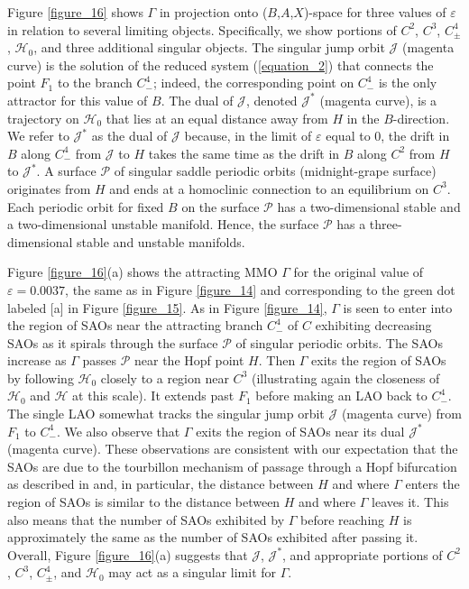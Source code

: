 \documentclass{ws-ijbc}
\begin{document}
Figure \ref{figure_16} shows $\Gamma$ in projection onto ($B$,$A$,$X$)-space for three values of $\varepsilon$ in relation to several limiting objects.  Specifically, we show portions of $C^2$, $C^3$, $C^4_\pm$, $\mathscr{H}_0$, and three additional singular objects.  The singular jump orbit $\mathscr{J}$ (magenta curve) is the solution of the reduced system (\ref{equation_2}) that connects the point $F_1$ to the branch $C^4_-$; indeed, the corresponding point on $C^4_-$ is the only attractor for this value of $B$.  The dual of $\mathscr{J}$, denoted $\mathscr{J}^*$ (magenta curve), is a trajectory on $\mathscr{H}_0$ that lies at an equal distance away from $H$ in the $B$-direction.  We refer to $\mathscr{J}^*$ as the dual of $\mathscr{J}$ because, in the limit of $\varepsilon$ equal to $0$, the drift in $B$ along $C^4_-$ from $\mathscr{J}$ to $H$ takes the same time as the drift in $B$ along $C^2$ from $H$ to $\mathscr{J}^*$.  A surface $\mathscr{P}$ of singular saddle periodic orbits (midnight-grape surface) originates from $H$ and ends at a homoclinic connection to an equilibrium on $C^3$.  Each periodic orbit for fixed $B$ on the surface $\mathscr{P}$ has a two-dimensional stable and a two-dimensional unstable manifold.  Hence, the surface $\mathscr{P}$ has a three-dimensional stable and unstable manifolds.

Figure \ref{figure_16}(a) shows the attracting MMO $\Gamma$ for the original value of $\varepsilon=0.0037$, the same as in Figure \ref{figure_14} and corresponding to the green dot labeled [a] in Figure \ref{figure_15}.  As in Figure \ref{figure_14}, $\Gamma$ is seen to enter into the region of SAOs near the attracting branch $C^4_-$ of $C$ exhibiting decreasing SAOs as it spirals through the surface $\mathscr{P}$ of singular periodic orbits. The SAOs increase as $\Gamma$ passes $\mathscr{P}$ near the Hopf point $H$.  Then $\Gamma$ exits the region of SAOs by following $\mathscr{H}_0$ closely to a region near $C^3$ (illustrating again the closeness of $\mathscr{H}_0$ and $\mathscr{H}$ at this scale).  It extends past $F_1$ before making an LAO back to $C^4_-$.  The single LAO somewhat tracks the singular jump orbit $\mathscr{J}$ (magenta curve) from $F_1$ to $C^4_-$.  We also observe that $\Gamma$ exits the region of SAOs near its dual $\mathscr{J}^*$ (magenta curve).  These observations are consistent with our expectation that the SAOs are due to the tourbillon mechanism of passage through a Hopf bifurcation as described in \cite{MMO} and, in particular, the distance between $H$ and where $\Gamma$ enters the region of SAOs is similar to the distance between $H$ and where $\Gamma$ leaves it.  This also means that the number of SAOs exhibited by $\Gamma$ before reaching $H$ is approximately the same as the number of SAOs exhibited after passing it.  Overall, Figure \ref{figure_16}(a) suggests that $\mathscr{J}$, $\mathscr{J}^*$, and appropriate portions of $C^2$, $C^3$, $C^4_\pm$, and $\mathscr{H}_0$ may act as a singular limit for $\Gamma$.
\end{document}
